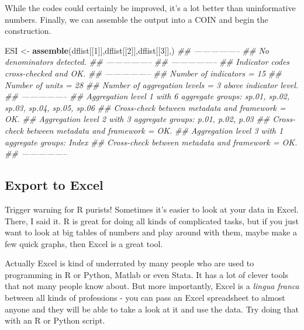 \documentclass[
]{book}
\newenvironment{Shaded}{\begin{snugshade}}{\end{snugshade}}
\newcommand{\CommentTok}[1]{\textcolor[rgb]{0.56,0.35,0.01}{\textit{#1}}}
\newcommand{\DecValTok}[1]{\textcolor[rgb]{0.00,0.00,0.81}{#1}}
\newcommand{\KeywordTok}[1]{\textcolor[rgb]{0.13,0.29,0.53}{\textbf{#1}}}
\newcommand{\NormalTok}[1]{#1}
\newcommand{\StringTok}[1]{\textcolor[rgb]{0.31,0.60,0.02}{#1}}
\begin{document}
While the codes could certainly be improved, it's a lot better than uninformative numbers. Finally, we can assemble the output into a COIN and begin the construction.

\begin{Shaded}
\begin{Highlighting}[]
\NormalTok{ESI <-}\StringTok{ }\KeywordTok{assemble}\NormalTok{(dflist[[}\DecValTok{1}\NormalTok{]],dflist[[}\DecValTok{2}\NormalTok{]],dflist[[}\DecValTok{3}\NormalTok{]],)}
\CommentTok{## -----------------}
\CommentTok{## No denominators detected.}
\CommentTok{## -----------------}
\CommentTok{## -----------------}
\CommentTok{## Indicator codes cross-checked and OK.}
\CommentTok{## -----------------}
\CommentTok{## Number of indicators = 15}
\CommentTok{## Number of units = 28}
\CommentTok{## Number of aggregation levels = 3 above indicator level.}
\CommentTok{## -----------------}
\CommentTok{## Aggregation level 1 with 6 aggregate groups: sp.01, sp.02, sp.03, sp.04, sp.05, sp.06}
\CommentTok{## Cross-check between metadata and framework = OK.}
\CommentTok{## Aggregation level 2 with 3 aggregate groups: p.01, p.02, p.03}
\CommentTok{## Cross-check between metadata and framework = OK.}
\CommentTok{## Aggregation level 3 with 1 aggregate groups: Index}
\CommentTok{## Cross-check between metadata and framework = OK.}
\CommentTok{## -----------------}
\end{Highlighting}
\end{Shaded}

\hypertarget{export-to-excel}{%
\subsection{Export to Excel}\label{export-to-excel}}

Trigger warning for R purists! Sometimes it's easier to look at your data in Excel. There, I said it. R is great for doing all kinds of complicated tasks, but if you just want to look at big tables of numbers and play around with them, maybe make a few quick graphs, then Excel is a great tool.

Actually Excel is kind of underrated by many people who are used to programming in R or Python, Matlab or even Stata. It has a lot of clever tools that not many people know about. But more importantly, Excel is a \emph{lingua franca} between all kinds of professions - you can pass an Excel spreadsheet to almost anyone and they will be able to take a look at it and use the data. Try doing that with an R or Python script.
\end{document}
